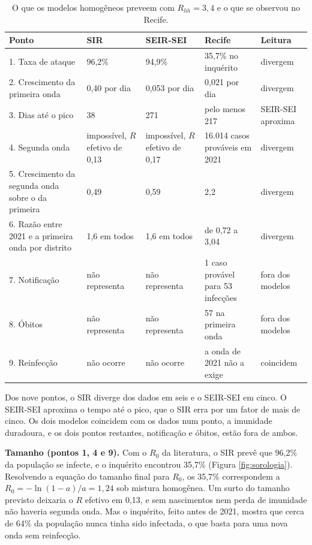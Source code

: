 \begin{table}[htbp]
\centering
\caption{O que os modelos homogêneos preveem com $R_{hh} = 3{,}4$ e o que se observou no Recife.}
\label{tab:comparacao}
\footnotesize
\begin{tabular}{L{3.9cm}L{2.1cm}L{2.1cm}L{3.6cm}L{2.0cm}}
\toprule
\textbf{Ponto} & \textbf{SIR} & \textbf{SEIR-SEI} & \textbf{Recife} & \textbf{Leitura} \\
. Taxa de ataque & 96,2\% & 94,9\% & 35,7\% no inquérito & divergem \\
2. Crescimento da primeira onda & 0,40 por dia & 0,053 por dia & 0,021 por dia & divergem \\
3. Dias até o pico & 38 & 271 & pelo menos 217 & SEIR-SEI aproxima \\
4. Segunda onda & impossível, $R$ efetivo de 0,13 & impossível, $R$ efetivo de 0,17 & 16.014 casos
prováveis em 2021 & divergem \\
5. Crescimento da segunda onda sobre o da primeira & 0,49 & 0,59 & 2,2 & divergem \\
6. Razão entre 2021 e a primeira onda por distrito & 1,6 em todos & 1,6 em todos & de 0,72 a 3,04 &
divergem \\
7. Notificação & não representa & não representa & 1 caso provável para 53 infecções & fora dos
modelos \\
8. Óbitos & não representa & não representa & 57 na primeira onda & fora dos modelos \\
9. Reinfecção & não ocorre & não ocorre & a onda de 2021 não a exige & coincidem \\
\bottomrule
\end{tabular}
\end{table}

Dos nove pontos, o SIR diverge dos dados em seis e o SEIR-SEI em cinco. O SEIR-SEI aproxima o tempo até o
pico, que o SIR erra por um fator de mais de cinco. Os dois modelos coincidem com os dados num ponto, a
imunidade duradoura, e os dois pontos restantes, notificação e óbitos, estão fora de ambos.

\textbf{Tamanho (pontos 1, 4 e 9).} Com o $R_0$ da literatura, o SIR prevê que 96,2\% da população se
infecte, e o inquérito encontrou 35,7\% (Figura \ref{fig:sorologia}). Resolvendo a equação do tamanho final
para $R_0$, os 35,7\% correspondem a $R_0 = -\ln(1 - a)/a = 1{,}24$ sob mistura homogênea. Um surto do
tamanho previsto deixaria o $R$ efetivo em 0,13, e sem nascimentos nem perda de imunidade não haveria
segunda onda. Mas o inquérito, feito antes de 2021, mostra que cerca de 64\% da população nunca tinha sido
infectada, o que basta para uma nova onda sem reinfecção.


